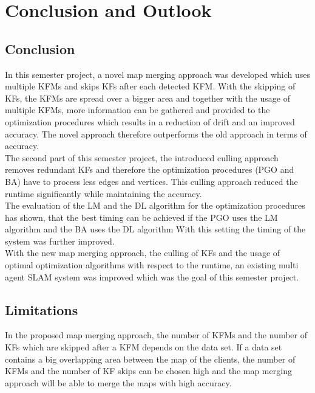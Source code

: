 \chapter{Conclusion and Outlook}

\section{Conclusion}
In this semester project, a novel map merging approach was developed which uses multiple \acp{KFM} and skips \acp{KF} after each detected \ac{KFM}. With the skipping of \acp{KF}, the \acp{KFM} are spread over a bigger area and together with the usage of multiple \acp{KFM}, more information can be gathered and provided to the optimization procedures which results in a reduction of drift and an improved accuracy. The novel approach therefore outperforms the old approach in terms of accuracy.\\

The second part of this semester project, the introduced culling approach removes redundant \acp{KF} and therefore the optimization procedures (\ac{PGO} and \ac{BA}) have to process less edges and vertices. This culling approach reduced the runtime significantly while maintaining the accuracy.\\

The evaluation of the \ac{LM} and the \ac{DL} algorithm for the optimization procedures has shown, that the best timing can be achieved if the \ac{PGO} uses the \ac{LM} algorithm and the \ac{BA} uses the \ac{DL} algorithm With this setting the timing of the system was further improved.\\

With the new map merging approach, the culling of \acp{KF} and the usage of optimal optimization algorithms with respect to the runtime, an existing multi agent \ac{SLAM} system was improved which was the goal of this semester project.

\section{Limitations}
In the proposed map merging approach, the number of \acp{KFM} and the number of \acp{KF} which are skipped after a \ac{KFM} depends on the data set. If a data set contains a big overlapping area between the map of the clients, the number of \acp{KFM} and the number of \ac{KF} skips can be chosen high and the map merging approach will be able to merge the maps with high accuracy.\\

